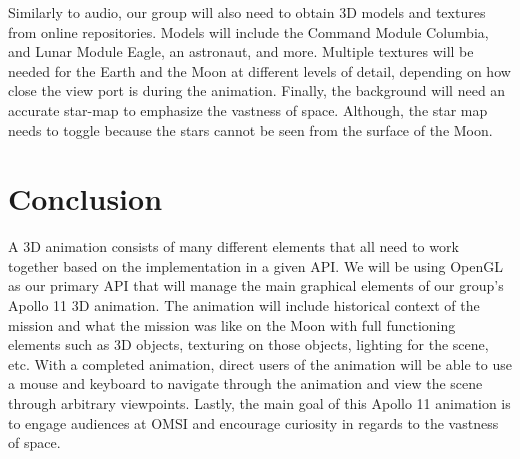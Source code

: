 \documentclass[onecolumn, draftclsnofoot,10pt, compsoc]{IEEEtran}
\begin{document}
    Similarly to audio, our group will also need to obtain 3D models and textures from online repositories. Models will include the Command Module Columbia, and Lunar Module Eagle, an astronaut, and more. Multiple textures will be needed for the Earth and the Moon at different levels of detail, depending on how close the view port is during the animation. Finally, the background will need an accurate star-map to emphasize the vastness of space. Although, the star map needs to toggle because the stars cannot be seen from the surface of the Moon. 
    
\section{Conclusion}
A 3D animation consists of many different elements that all need to work together based on the implementation in a given API. We will be using OpenGL as our primary API that will manage the main graphical elements of our group's Apollo 11 3D animation. The animation will include historical context of the mission and what the mission was like on the Moon with full functioning elements such as 3D objects, texturing on those objects, lighting for the scene, etc. With a completed animation, direct users of the animation will be able to use a mouse and keyboard to navigate through the animation and view the scene through arbitrary viewpoints. Lastly, the main goal of this Apollo 11 animation is to engage audiences at OMSI and encourage curiosity in regards to the vastness of space. 
\end{document}
